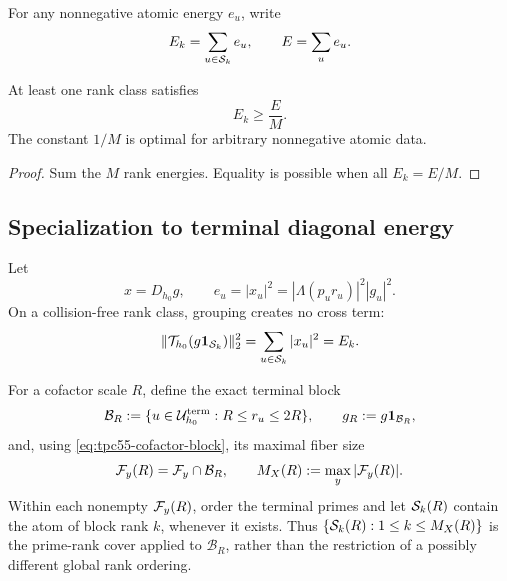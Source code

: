 For any nonnegative atomic energy \(e_u\), write
\begin{equation}
 E_k=\sum_{u\in\mathcal S_k}e_u,
 \qquad E=\sum_ue_u.
 \label{eq:tpc55-rank-energies}
\end{equation}

\begin{corollary}
\label{cor:tpc55-rank-energy-capture}
At least one rank class satisfies
\begin{equation}
 E_k\ge\frac EM.
 \label{eq:tpc55-rank-pigeonhole}
\end{equation}
The constant \(1/M\) is optimal for arbitrary nonnegative atomic data.
\end{corollary}

\begin{proof}
Sum the \(M\) rank energies.  Equality is possible when all \(E_k=E/M\).
\end{proof}

\subsection{Specialization to terminal diagonal energy}

Let
\begin{equation}
 x=D_{h_0}g,
 \qquad
 e_u=|x_u|^2
 =|\Lambda(p_ur_u)|^2|g_u|^2.
 \label{eq:tpc55-terminalized-array}
\end{equation}
On a collision-free rank class, grouping creates no cross term:
\begin{equation}
 \|\mathcal T_{h_0}(g\mathbf 1_{\mathcal S_k})\|_2^2
 =\sum_{u\in\mathcal S_k}|x_u|^2=E_k.
 \label{eq:tpc55-transversal-exact-energy}
\end{equation}

For a cofactor scale \(R\), define the exact terminal block
\begin{equation}
 \mathcal B_R
 :=\{u\in\mathcal U_{h_0}^{\rm term}:R\le r_u\le2R\},
 \qquad
 g_R:=g\mathbf 1_{\mathcal B_R},
 \label{eq:tpc55-terminal-block}
\end{equation}
and, using \eqref{eq:tpc55-cofactor-block}, its maximal fiber size
\begin{equation}
 \mathcal F_y(R)=\mathcal F_y\cap\mathcal B_R,
 \qquad
 M_X(R):=\max_y|\mathcal F_y(R)|.
 \label{eq:tpc55-block-fibers}
\end{equation}
Within each nonempty \(\mathcal F_y(R)\), order the terminal primes and let
\(\mathcal S_k(R)\) contain the atom of block rank \(k\), whenever it exists.
Thus \(\{\mathcal S_k(R):1\le k\le M_X(R)\}\) is the prime-rank cover applied
to \(\mathcal B_R\), rather than the restriction of a possibly different global
rank ordering.

